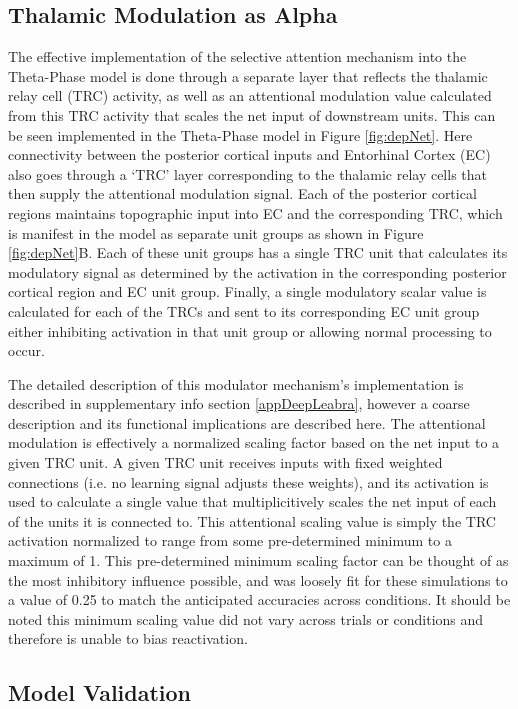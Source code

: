 \documentclass[11pt, titlepage, twoside]{article}
\begin{document}
\subsection{Thalamic Modulation as Alpha}
\label{sec:attmod}
The effective implementation of the selective attention mechanism into the Theta-Phase model is done through a separate layer that reflects the thalamic relay cell (TRC) activity, as well as an attentional modulation value calculated from this TRC activity that scales the net input of downstream units.  This can be seen implemented in the Theta-Phase model in Figure \ref{fig:depNet}.  Here connectivity between the posterior cortical inputs and Entorhinal Cortex (EC) also goes through a `TRC' layer corresponding to the thalamic relay cells that then supply the attentional modulation signal.  Each of the posterior cortical regions maintains topographic input into EC and the corresponding TRC, which is manifest in the model as separate unit groups as shown in Figure \ref{fig:depNet}B.  Each of these unit groups has a single TRC unit that calculates its modulatory signal as determined by the activation in the corresponding posterior cortical region and EC unit group.  Finally, a single modulatory scalar value is calculated for each of the TRCs and sent to its corresponding EC unit group either inhibiting activation in that unit group or allowing normal processing to occur. 

The detailed description of this modulator mechanism's implementation is described in supplementary info section \ref{appDeepLeabra}, however a coarse description and its functional implications are described here.  The attentional modulation is effectively a normalized scaling factor based on the net input to a given TRC unit.  A given TRC unit receives inputs with fixed weighted connections (i.e. no learning signal adjusts these weights), and its activation is used to calculate a single value that multiplicitively scales the net input of each of the units it is connected to.  This attentional scaling value is simply the TRC activation normalized to range from some pre-determined minimum to a maximum of 1.  This pre-determined minimum scaling factor can be thought of as the most inhibitory influence possible, and was loosely fit for these simulations to a value of 0.25 to match the anticipated accuracies across conditions.  It should be noted this minimum scaling value did not vary across trials or conditions and therefore is unable to bias reactivation. 


\subsection{Model Validation}
\label{sec:ModelTest}
\end{document}
